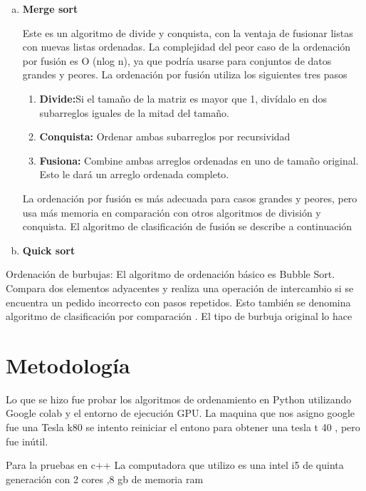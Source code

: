 \documentclass[a4paper]{article}
\begin{document}
\begin{enumerate}[a)]
\item \textbf{Merge sort}

Este es un algoritmo de divide y conquista, con la ventaja  de fusionar listas con nuevas listas ordenadas. La complejidad del peor caso de la ordenación por fusión es O (nlog n), ya que podría usarse para conjuntos de datos grandes y peores. 
La ordenación por fusión utiliza los siguientes tres pasos \cite{merge} 

\begin{enumerate}[1)]
\item \textbf{Divide:}Si el tamaño de la matriz es mayor que 1, divídalo en dos subarreglos iguales de la mitad del tamaño.
\item \textbf{Conquista:} Ordenar ambas subarreglos por recursividad
\item \textbf{Fusiona:} Combine ambas arreglos ordenadas en uno de tamaño original. Esto le dará un arreglo ordenada completo.


\end{enumerate}



 La ordenación por fusión es más adecuada para casos grandes y peores, pero usa más memoria en comparación con otros algoritmos de división y conquista. El algoritmo de clasificación de fusión se describe a continuación

\item \textbf{Quick sort}


\end{enumerate}


 Ordenación de burbujas: El algoritmo de ordenación básico es Bubble Sort. Compara dos elementos adyacentes y realiza una operación de intercambio si se encuentra un pedido incorrecto con pasos repetidos. Esto también se denomina algoritmo de clasificación por comparación . El tipo de burbuja original lo hace 


\section{Metodología}

Lo que se hizo fue probar los algoritmos de ordenamiento  en Python 
utilizando Google colab y el entorno de ejecución GPU. La maquina que nos asigno google fue una Tesla k80 se intento reiniciar el entono para obtener una tesla t 40 , pero fue inútil.

Para la pruebas en c++
La computadora  que utilizo es una intel i5 de quinta generación  con 2 cores ,8 gb  de memoria ram 
\end{document}

